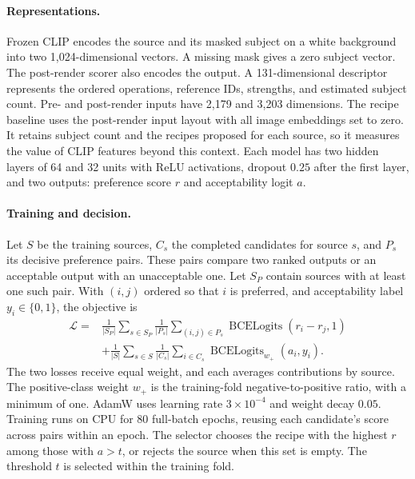 \documentclass{article}
\begin{document}
\paragraph{Representations.} Frozen CLIP encodes the source and its masked subject on a white background into two 1,024-dimensional vectors. A missing mask gives a zero subject vector. The post-render scorer also encodes the output. A 131-dimensional descriptor represents the ordered operations, reference IDs, strengths, and estimated subject count. Pre- and post-render inputs have 2,179 and 3,203 dimensions. The recipe baseline uses the post-render input layout with all image embeddings set to zero. It retains subject count and the recipes proposed for each source, so it measures the value of CLIP features beyond this context. Each model has two hidden layers of 64 and 32 units with ReLU activations, dropout $0.25$ after the first layer, and two outputs: preference score $r$ and acceptability logit $a$.

\paragraph{Training and decision.} Let $S$ be the training sources, $C_s$ the completed candidates for source $s$, and $P_s$ its decisive preference pairs. These pairs compare two ranked outputs or an acceptable output with an unacceptable one. Let $S_P$ contain sources with at least one such pair. With $(i,j)$ ordered so that $i$ is preferred, and acceptability label $y_i\in\{0,1\}$, the objective is
\begin{equation}
\begin{aligned}
\mathcal{L}={}&\frac{1}{|S_P|}\sum_{s\in S_P}\frac{1}{|P_s|}
\sum_{(i,j)\in P_s}\operatorname{BCELogits}(r_i-r_j,1)\\
&+\frac{1}{|S|}\sum_{s\in S}\frac{1}{|C_s|}
\sum_{i\in C_s}\operatorname{BCELogits}_{w_+}(a_i,y_i).
\end{aligned}
\end{equation}
The two losses receive equal weight, and each averages contributions by source. The positive-class weight $w_+$ is the training-fold negative-to-positive ratio, with a minimum of one. AdamW uses learning rate $3\times10^{-4}$ and weight decay $0.05$. Training runs on CPU for 80 full-batch epochs, reusing each candidate's score across pairs within an epoch. The selector chooses the recipe with the highest $r$ among those with $a>t$, or rejects the source when this set is empty. The threshold $t$ is selected within the training fold.
\end{document}
